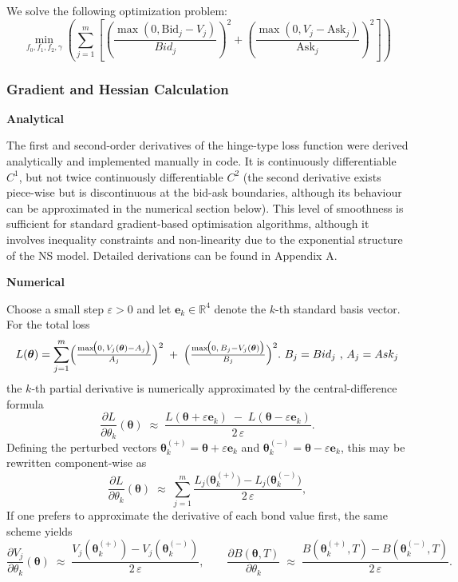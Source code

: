 \documentclass[12pt]{article}
\begin{document}
We solve the following optimization problem:
\[
\min_{f_0, f_1, f_2, \gamma} \left(
\sum_{j=1}^m \left[
\left( \frac{\max(0, \text{Bid}_j - V_j)}{{Bid}_j} \right)^2 +
\left( \frac{\max(0, V_j - \text{Ask}_j)}{\text{Ask}_j} \right)^2
\right]
\right)
\]

\subsubsection{Gradient and Hessian Calculation}\label{subsubsec:grad_hess}

\textbf{Analytical}

The first and second-order derivatives of the hinge-type loss function were derived analytically and implemented manually in code. It is continuously differentiable \( C^1 \), but not twice continuously differentiable \( C^2 \) (the second derivative exists piece-wise but is discontinuous at the bid-ask boundaries, although its behaviour can be approximated in the numerical section below). This level of smoothness is sufficient for standard gradient-based optimisation algorithms, although it involves inequality constraints and non‑linearity due to the exponential structure of the NS model. Detailed derivations can be found in Appendix A. 

\textbf{Numerical}

Choose a small step \(\varepsilon>0\) and let \(\mathbf e_k\in\mathbb R^{4}\) denote the \(k\)-th standard basis vector.  For the total loss
\[
  L(\boldsymbol{\theta})=\sum_{j=1}^{m}
  \Bigl(\tfrac{\max\!\bigl(0,\,V_j(\boldsymbol{\theta})-A_j\bigr)}{A_j}\Bigr)^{2}
 \;+\;
  \Bigl(\tfrac{\max\!\bigl(0,\,B_j-V_j(\boldsymbol{\theta})\bigr)}{B_j}\Bigr)^{2}.
  \text{  } B_j = Bid_j\text{  ,  } A_j = Ask_j
\]
the \(k\)-th partial derivative is numerically approximated by the central-difference formula  
\[
  \frac{\partial L}{\partial\theta_k}(\boldsymbol{\theta})
  \;\approx\;
  \frac{L(\boldsymbol{\theta}+\varepsilon\mathbf e_k)\;-\;L(\boldsymbol{\theta}-\varepsilon\mathbf e_k)}
       {2\,\varepsilon}.
\]
Defining the perturbed vectors \(\boldsymbol{\theta}^{(+)}_k = \boldsymbol{\theta}+\varepsilon\mathbf e_k\) and \(\boldsymbol{\theta}^{(-)}_k = \boldsymbol{\theta}-\varepsilon\mathbf e_k\), this may be rewritten component-wise as  
\[
  \frac{\partial L}{\partial\theta_k}(\boldsymbol{\theta})
  \;\approx\;
  \sum_{j=1}^{m}
  \frac{L_j\bigl(\boldsymbol{\theta}^{(+)}_k\bigr)
        -L_j\bigl(\boldsymbol{\theta}^{(-)}_k\bigr)}
       {2\,\varepsilon},
\]
If one prefers to approximate the derivative of each bond value first, the same scheme yields  
\[
  \frac{\partial V_j}{\partial\theta_k}(\boldsymbol{\theta})
  \;\approx\;
  \frac{V_j(\boldsymbol{\theta}^{(+)}_k)-V_j(\boldsymbol{\theta}^{(-)}_k)}{2\,\varepsilon},
  \qquad
  \frac{\partial B(\boldsymbol{\theta},T)}{\partial\theta_k}
  \;\approx\;
  \frac{B(\boldsymbol{\theta}^{(+)}_k,T)-B(\boldsymbol{\theta}^{(-)}_k,T)}{2\,\varepsilon}.
\]
\end{document}
